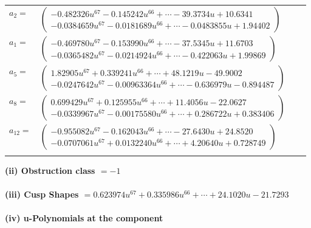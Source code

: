 \documentclass[1p]{elsarticle_modified}
\theoremstyle{definition}
\begin{document}
\begin{tabular}{m{7pt} m{180pt} m{7pt} m{180pt} }
\flushright $a_{2}=$&$\begin{pmatrix}-0.482326 u^{67}-0.145242 u^{66}+\cdots-39.3734 u+10.6341\\-0.0384659 u^{67}-0.0181689 u^{66}+\cdots-0.0483855 u+1.94402\end{pmatrix}$ \\
\flushright $a_{1}=$&$\begin{pmatrix}-0.469780 u^{67}-0.153990 u^{66}+\cdots-37.5345 u+11.6703\\-0.0365482 u^{67}-0.0214924 u^{66}+\cdots-0.422063 u+1.99869\end{pmatrix}$ \\
\flushright $a_{5}=$&$\begin{pmatrix}1.82905 u^{67}+0.339241 u^{66}+\cdots+48.1219 u-49.9002\\-0.0247642 u^{67}-0.00963364 u^{66}+\cdots-0.636979 u-0.894487\end{pmatrix}$ \\
\flushright $a_{8}=$&$\begin{pmatrix}0.699429 u^{67}+0.125955 u^{66}+\cdots+11.4056 u-22.0627\\-0.0339967 u^{67}-0.00175580 u^{66}+\cdots+0.286722 u+0.383406\end{pmatrix}$ \\
\flushright $a_{12}=$&$\begin{pmatrix}-0.955082 u^{67}-0.162043 u^{66}+\cdots-27.6430 u+24.8520\\-0.0707061 u^{67}+0.0132240 u^{66}+\cdots+4.20640 u+0.728749\end{pmatrix}$\\&\end{tabular}
\flushleft \textbf{(ii) Obstruction class $= -1$}\\~\\
\flushleft \textbf{(iii) Cusp Shapes $= 0.623974 u^{67}+0.335986 u^{66}+\cdots+24.1020 u-21.7293$}\\~\\
\newpage\renewcommand{\arraystretch}{1}
\flushleft \textbf{(iv) u-Polynomials at the component}\newline \\
\end{document}
